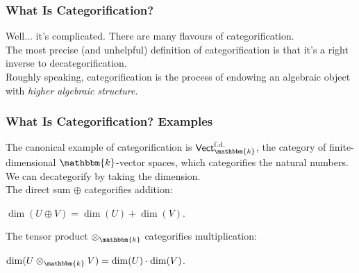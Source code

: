 \documentclass{beamer}
\newcommand*{\emphasis}[1]{\textcolor{structure}{\em #1}}
\begin{document}
\begin{frame}
\frametitle{What Is Categorification?}
Well... it's complicated. There are many flavours of categorification.\\[2ex]
The most precise (and unhelpful) definition of categorification is that it's a right inverse to decategorification.\\[2ex]
Roughly speaking, categorification is the process of endowing an algebraic object with \emphasis{higher algebraic structure}.\\[2ex]
\end{frame}

\begin{frame}
\frametitle{What Is Categorification? Examples}
The canonical example of categorification is $\textsf{Vect}^\text{f.d.}_\mathbbm{k}$, the category of finite-dimensional $\mathbbm{k}$-vector spaces, which categorifies the natural numbers.\\[2ex]
We can decategorify by taking the dimension.\\[2ex]
The direct sum $\oplus$ categorifies addition:
\begin{center}$\dim(U \oplus V) = \dim(U) + \dim(V)$.\end{center}
The tensor product $\otimes_\mathbbm{k}$ categorifies multiplication:
\begin{center}$\dim(U \otimes_\mathbbm{k} V) = \dim(U) \cdot \dim(V)$.\end{center}
\end{frame}
\end{document}
